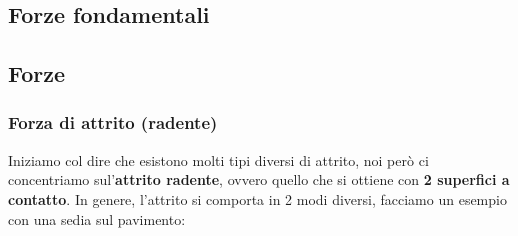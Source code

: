    \subsection{Forze fondamentali}






    \subsection{Forze}








        \subsubsection{Forza di attrito (radente)}
            Iniziamo col dire che esistono molti tipi diversi di attrito, noi però ci concentriamo sul'\textbf{attrito radente}, ovvero quello che si ottiene con \textbf{2 superfici a contatto}. In genere, l'attrito si comporta in 2 modi diversi, facciamo un esempio con una sedia sul pavimento:
